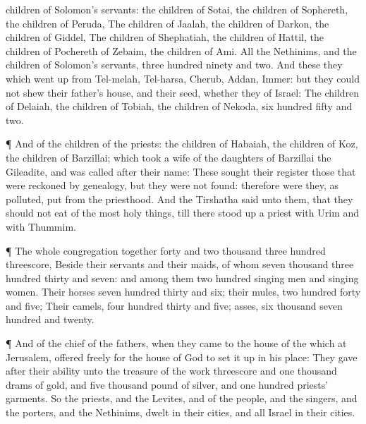 {children of
Solomon’s
servants: the
children of
Sotai, the
children of
Sophereth, the
children of
Peruda,
The
children of
Jaalah, the
children of
Darkon, the
children of
Giddel,
The
children of
Shephatiah, the
children of
Hattil, the
children of Pochereth of
Zebaim, the
children of
Ami.
All the
Nethinims, and the
children of
Solomon’s
servants,
{}
three
hundred
ninety and
two.
And these
{} they which went
up from
Tel-melah,
Tel-harsa,
Cherub,
Addan,
{}
Immer: but they
could not
shew their
father’s
house, and their
seed, whether they
{} of
Israel:
The
children of
Delaiah, the
children of
Tobiah, the
children of
Nekoda,
six
hundred
fifty and
two.
\par }{\PP {}¶ And of the
children of the
priests: the
children of
Habaiah, the
children of
Koz, the
children of
Barzillai; which
took a
wife of the
daughters of
Barzillai the
Gileadite, and was
called after their
name:
These
sought their
register
{} those that were reckoned by
genealogy, but they were not
found: therefore were they, as
polluted, put from the
priesthood.
And the
Tirshatha
said unto them, that they should not
eat of the
most holy
things, till there stood
up a
priest with
Urim and with
Thummim.
\par }{\PP {}¶ The whole
congregation
together
{}
forty and two
thousand
three
hundred
{}
threescore,
Beside their
servants and their
maids, of whom
{}
seven
thousand
three
hundred
thirty and
seven: and
{} among them two
hundred singing
men and singing
women.
Their
horses
{}
seven
hundred
thirty and
six; their
mules, two
hundred
forty and
five;
Their
camels,
four
hundred
thirty and
five;
{}
asses,
six
thousand
seven
hundred and
twenty.
\par }{\PP {}¶ And
{} of the
chief of the
fathers, when they
came to the
house of the
{} which
{} at
Jerusalem, offered
freely for the
house of
God to set it
up in his
place:
They
gave after their
ability unto the
treasure of the
work
threescore and one
thousand
drams of
gold, and
five
thousand
pound of
silver, and one
hundred
priests’
garments.
So the
priests, and the
Levites, and
{} of the
people, and the
singers, and the
porters, and the
Nethinims,
dwelt in their
cities, and all
Israel in their
cities.

}
